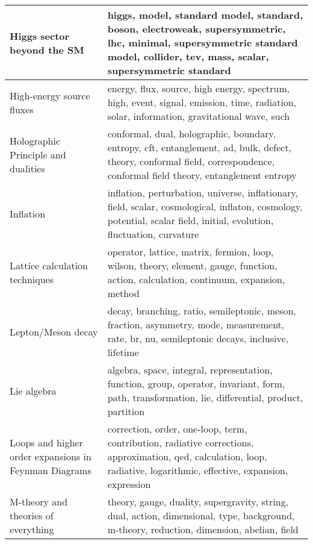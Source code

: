 \begin{longtable}[H]{p{}|p{}}
Higgs sector beyond the SM                            &                              higgs, model, standard model, standard, boson, electroweak, supersymmetric, lhc, minimal, supersymmetric standard model, collider, tev, mass, scalar, supersymmetric standard \\ \midrule
High-energy source fluxes                             &                                                                  energy, flux, source, high energy, spectrum, high, event, signal, emission, time, radiation, solar, information, gravitational wave, such \\ \midrule
Holographic Principle and dualities                   &                                conformal, dual, holographic, boundary, entropy, cft, entanglement, ad, bulk, defect, theory, conformal field, correspondence, conformal field theory, entanglement entropy \\ \midrule
Inflation                                             &                                     inflation, perturbation, universe, inflationary, field, scalar, cosmological, inflaton, cosmology, potential, scalar field, initial, evolution, fluctuation, curvature \\ \midrule
Lattice calculation techniques                        &                                                                      operator, lattice, matrix, fermion, loop, wilson, theory, element, gauge, function, action, calculation, continuum, expansion, method \\ \midrule
Lepton/Meson decay                                    &                                                               decay, branching, ratio, semileptonic, meson, fraction, asymmetry, mode, measurement, rate, br, nu, semileptonic decays, inclusive, lifetime \\ \midrule
Lie algebra                                           &                                                          algebra, space, integral, representation, function, group, operator, invariant, form, path, transformation, lie, differential, product, partition \\ \midrule
Loops and higher order expansions in Feynman Diagrams &                                    correction, order, one-loop, term, contribution, radiative corrections, approximation, qed, calculation, loop, radiative, logarithmic, effective, expansion, expression \\ \midrule
M-theory and theories of everything                   &                                                                  theory, gauge, duality, supergravity, string, dual, action, dimensional, type, background, m-theory, reduction, dimension, abelian, field \\ \midrule

\end{longtable}
